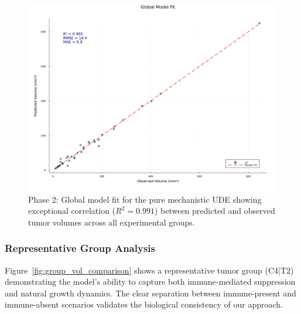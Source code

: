 \documentclass{juliacon}
\begin{document}
\begin{figure}[H]\centering
\includegraphics[width=\linewidth]{global_fit.png}
\caption{Phase 2: Global model fit for the pure mechanistic UDE showing exceptional correlation ($R^2 = 0.991$) between predicted and observed tumor volumes across all experimental groups.}
\label{fig:global_fit}
\end{figure}

\subsubsection{Representative Group Analysis}

Figure~\ref{fig:group_vol_comparison} shows a representative tumor group (C4|T2) demonstrating the model's ability to capture both immune-mediated suppression and natural growth dynamics. The clear separation between immune-present and immune-absent scenarios validates the biological consistency of our approach.
\end{document}

